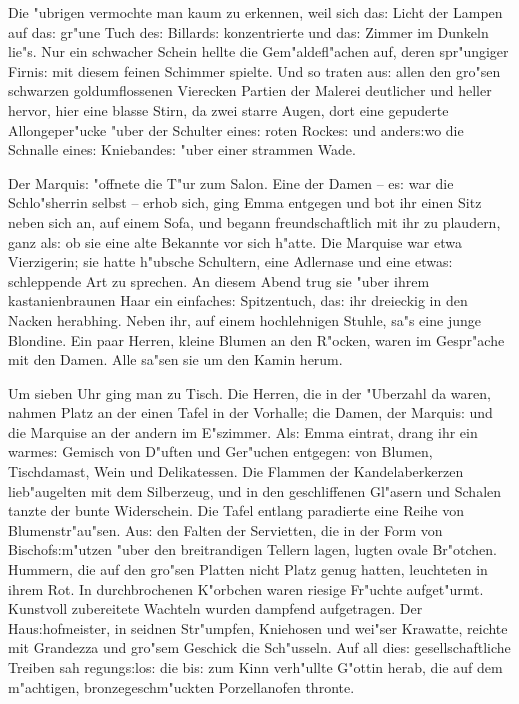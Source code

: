 \documentclass[oneside,12pt]{book}
\newcommand{\s}{s:}%
\begin{document}
Die "ubrigen vermochte man kaum zu erkennen, weil sich da{\s}
Licht der Lampen auf da{\s} gr"une Tuch de{\s} Billard{\s}
konzentrierte und da{\s} Zimmer im Dunkeln lie"s. Nur ein
schwacher Schein hellte die Gem"aldefl"achen auf, deren
spr"ungiger Firni{\s} mit diesem feinen Schimmer spielte. Und so
traten au{\s} allen den gro"sen schwarzen goldumflossenen
Vierecken Partien der Malerei deutlicher und heller hervor, hier
eine blasse Stirn, da zwei starre Augen, dort eine gepuderte
Allongeper"ucke "uber der Schulter eine{\s} roten Rocke{\s} und
ander{\s}wo die Schnalle eine{\s} Kniebande{\s} "uber einer
strammen Wade.

Der Marqui{\s} "offnete die T"ur zum Salon. Eine der Damen --
e{\s} war die Schlo"sherrin selbst -- erhob sich, ging Emma
entgegen und bot ihr einen Sitz neben sich an, auf einem Sofa, und
begann freundschaftlich mit ihr zu plaudern, ganz al{\s} ob sie
eine alte Bekannte vor sich h"atte. Die Marquise war etwa
Vierzigerin; sie hatte h"ubsche Schultern, eine Adlernase und eine
etwa{\s} schleppende Art zu sprechen. An diesem Abend trug sie
"uber ihrem kastanienbraunen Haar ein einfache{\s} Spitzentuch,
da{\s} ihr dreieckig in den Nacken herabhing. Neben ihr, auf einem
hochlehnigen Stuhle, sa"s eine junge Blondine. Ein paar Herren,
kleine Blumen an den R"ocken, waren im Gespr"ache mit den Damen.
Alle sa"sen sie um den Kamin herum.

Um sieben Uhr ging man zu Tisch. Die Herren, die in der "Uberzahl
da waren, nahmen Platz an der einen Tafel in der Vorhalle; die
Damen, der Marqui{\s} und die Marquise an der andern im E"szimmer.
Al{\s} Emma eintrat, drang ihr ein warme{\s} Gemisch von D"uften
und Ger"uchen entgegen: von Blumen, Tischdamast, Wein und
Delikatessen. Die Flammen der Kandelaberkerzen lieb"augelten mit
dem Silberzeug, und in den geschliffenen Gl"asern und Schalen
tanzte der bunte Widerschein. Die Tafel entlang paradierte eine
Reihe von Blumenstr"au"sen. Au{\s} den Falten der Servietten, die
in der Form von Bischof{\s}m"utzen "uber den breitrandigen Tellern
lagen, lugten ovale Br"otchen. Hummern, die auf den gro"sen
Platten nicht Platz genug hatten, leuchteten in ihrem Rot. In
durchbrochenen K"orbchen waren riesige Fr"uchte aufget"urmt.
Kunstvoll zubereitete Wachteln wurden dampfend aufgetragen. Der
Hau{\s}hofmeister, in seidnen Str"umpfen, Kniehosen und wei"ser
Krawatte, reichte mit Grandezza und gro"sem Geschick die
Sch"usseln. Auf all die{\s} gesellschaftliche Treiben sah
regung{\s}lo{\s} die bi{\s} zum Kinn verh"ullte G"ottin herab, die
auf dem m"achtigen, bronzegeschm"uckten Porzellanofen thronte.
\end{document}

